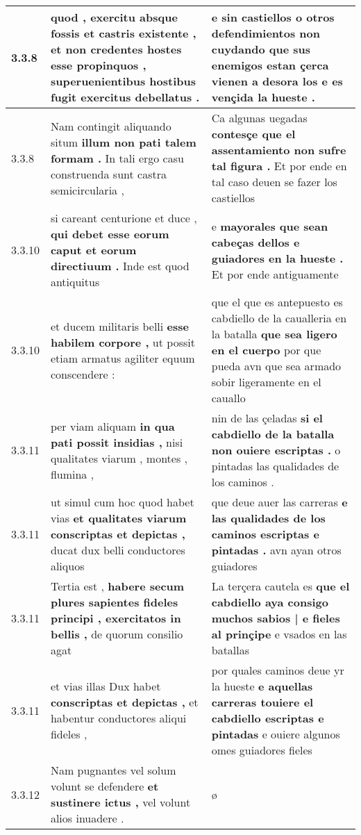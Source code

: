 \begin{tabular}{|p{1cm}|p{6.5cm}|p{6.5cm}|}
3.3.8 & quod , exercitu absque fossis et castris existente , \textbf{ et non credentes hostes esse propinquos , } superuenientibus hostibus fugit exercitus debellatus . & e sin castiellos o otros defendimientos non cuydando \textbf{ que sus enemigos estan çerca vienen a desora los } e es vençida la hueste . \\\hline
3.3.8 & Nam contingit aliquando situm \textbf{ illum non pati talem formam . } In tali ergo casu construenda sunt castra semicircularia , & Ca algunas uegadas \textbf{ contesçe que el assentamiento non sufre tal figura . } Et por ende en tal caso deuen se fazer los castiellos \\\hline
3.3.10 & si careant centurione et duce , \textbf{ qui debet esse eorum caput et eorum directiuum . } Inde est quod antiquitus & e \textbf{ mayorales que sean cabeças dellos e guiadores en la hueste . } Et por ende antiguamente \\\hline
3.3.10 & et ducem militaris belli \textbf{ esse habilem corpore , } ut possit etiam armatus agiliter equum conscendere : & que el que es antepuesto es cabdiello de la caualleria en la batalla \textbf{ que sea ligero en el cuerpo } por que pueda avn que sea armado sobir ligeramente en el cauallo \\\hline
3.3.11 & per viam aliquam \textbf{ in qua pati possit insidias , } nisi qualitates viarum , montes , flumina , & nin de las çeladas \textbf{ si el cabdiello de la batalla non ouiere escriptas . } o pintadas las qualidades de los caminos . \\\hline
3.3.11 & ut simul cum hoc quod habet vias \textbf{ et qualitates viarum conscriptas et depictas , } ducat dux belli conductores aliquos & que deue auer las carreras \textbf{ e las qualidades de los caminos escriptas e pintadas . } avn ayan otros guiadores \\\hline
3.3.11 & Tertia est , \textbf{ habere secum plures sapientes fideles principi , exercitatos in bellis , } de quorum consilio agat & La terçera cautela es \textbf{ que el cabdiello aya consigo muchos sabios | e fieles al prinçipe } e vsados en las batallas \\\hline
3.3.11 & et vias illas Dux habet \textbf{ conscriptas et depictas , } et habentur conductores aliqui fideles , & por quales caminos deue yr la hueste \textbf{ e aquellas carreras touiere el cabdiello escriptas e pintadas } e ouiere algunos omes guiadores fieles \\\hline
3.3.12 & Nam pugnantes vel solum volunt se defendere \textbf{ et sustinere ictus , } vel volunt alios inuadere . & ø \\\hline

\end{tabular}
